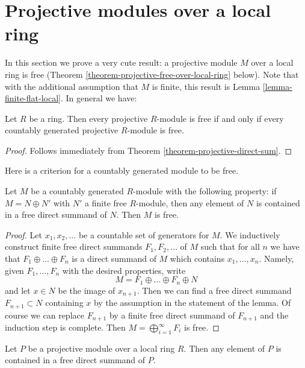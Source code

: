\section{Projective modules over a local ring}
\label{section-projective-local-ring}

\noindent
In this section we prove a very cute result:
a projective module $M$ over a local ring is free
(Theorem \ref{theorem-projective-free-over-local-ring} below).
Note that with  the additional assumption that $M$ is finite, this result is
Lemma \ref{lemma-finite-flat-local}.
In general we have:

\begin{lemma}
\label{lemma-projective-free}
Let $R$ be a ring.  Then every projective $R$-module is free if and only if
every countably generated projective $R$-module is free.
\end{lemma}

\begin{proof}
Follows immediately from
Theorem \ref{theorem-projective-direct-sum}.
\end{proof}

\noindent
Here is a criterion for a countably generated module to be free.

\begin{lemma}
\label{lemma-freeness-criteria}
Let $M$ be a countably generated $R$-module with the following property:
if $M = N \oplus N'$ with $N'$ a finite free $R$-module, then
any element of $N$ is contained in a free direct summand of $N$.
Then $M$ is free.
\end{lemma}

\begin{proof}
Let $x_1, x_2, \ldots$ be a countable set of generators for $M$.
We inductively construct finite free direct summands
$F_1, F_2, \ldots$ of $M$ such that for all $n$ we have
that $F_1 \oplus \ldots \oplus F_n$ is a direct summand of $M$
which contains $x_1, \ldots, x_n$. Namely, given $F_1, \ldots, F_n$
with the desired properties, write
$$
M = F_1 \oplus \ldots \oplus F_n \oplus N
$$
and let $x \in N$ be the image of $x_{n + 1}$.
Then we can find a free direct summand $F_{n + 1} \subset N$
containing $x$ by the assumption in the statement of the lemma.
Of course we can replace $F_{n + 1}$ by a finite free direct
summand of $F_{n + 1}$ and the induction step is complete.
Then $M = \bigoplus_{i = 1}^{\infty} F_i$ is free.
\end{proof}

\begin{lemma}
\label{lemma-projective-freeness-criteria}
Let $P$ be a projective module over a local ring $R$.  Then any element of $P$
is contained in a free direct summand of $P$.
\end{lemma}

